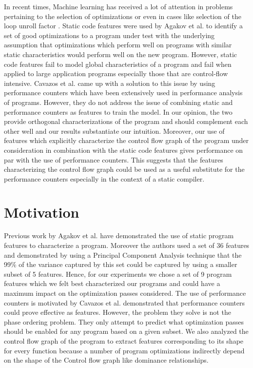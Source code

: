 \documentclass[10pt]{sigplanconf}
\begin{document}
In recent times, Machine learning has received a lot of attention in problems pertaining to the selection of optimizations \cite{c4}  or even in cases like selection of the loop unroll factor \cite{c3}. Static code features were used by Agakov et al. \cite{c6} to identify a set of good optimizations to a program under test with the underlying assumption that optimizations which perform well on programs with similar static characteristics would perform well on the new program. However, static code features fail to model global characteristics of a program and fail when applied to large application programs especially those that are control-flow intensive. Cavazos et al. \cite{c7} came up with a solution  to this issue by using performance counters which have been extensively used in performance analysis of programs. However, they do not address the issue of combining static and performance counters as features to train the model. In our opinion, the two provide orthogonal characterizations of the program and should complement each other well and our results substantiate our intuition. Moreover, our use of features which explicitly characterize the control flow graph of the program under consideration in combination with the static code features gives performance on par with the use of performance counters. This suggests that the features characterizing the control flow graph could be used as a useful substitute for the performance counters especially in the context of a static compiler. 

\section{Motivation}

Previous work by Agakov et al. \cite{c5} have demonstrated the use of static program features to characterize a program. Moreover the authors used a set of 36 features and demonstrated by using a Principal Component Analysis technique that the 99\% of the variance captured by this set could be captured by using a smaller subset of 5 features. Hence, for our experiments we chose a set of 9 program features which we felt best characterized our programs and could have a maximum impact on the optimization passes considered. The use of performance counters is motivated by Cavazos et al.\cite{7} demonstrated that performance counters could prove effective as features. However, the problem they solve is not the phase ordering problem. They only attempt to predict what optimization passes should be enabled for any program based on a given subset. We also analyzed the control flow graph of the program to extract features corresponding to its shape for every function because a number of program optimizations indirectly depend on the shape of the Control flow graph like dominance relationships. \\
\end{document}

